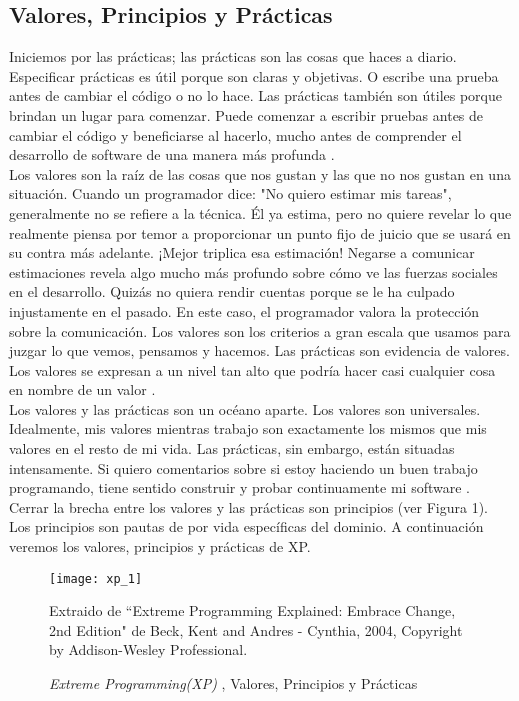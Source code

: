 \begin{spacing}{1.5}
	\subsection{Valores, Principios y Pr\'{a}cticas}
		Iniciemos por las pr\'{a}cticas; las prácticas son las cosas que haces a diario. Especificar prácticas es útil porque son claras y objetivas. O escribe una prueba antes de cambiar el código o no lo hace. Las prácticas también son útiles porque brindan un lugar para comenzar. Puede comenzar a escribir pruebas antes de cambiar el código y beneficiarse al hacerlo, mucho antes de comprender el desarrollo de software de una manera más profunda \cite{chap2_extreme_programming}.\\
		Los valores son la raíz de las cosas que nos gustan y las que no nos gustan en una situación. Cuando un programador dice: "No quiero estimar mis tareas", generalmente no se refiere a la técnica. Él ya estima, pero no quiere revelar lo que realmente piensa por temor a proporcionar un punto fijo de juicio que se usará en su contra más adelante. ¡Mejor triplica esa estimación! Negarse a comunicar estimaciones revela algo mucho más profundo sobre cómo ve las fuerzas sociales en el desarrollo. Quizás no quiera rendir cuentas porque se le ha culpado injustamente en el pasado. En este caso, el programador valora la protección sobre la comunicación. Los valores son los criterios a gran escala que usamos para juzgar lo que vemos, pensamos y hacemos. Las prácticas son evidencia de valores. Los valores se expresan a un nivel tan alto que podría hacer casi cualquier cosa en nombre de un valor \cite{chap2_extreme_programming}.\\
		Los valores y las prácticas son un océano aparte. Los valores son universales. Idealmente, mis valores mientras trabajo son exactamente los mismos que mis valores en el resto de mi vida. Las prácticas, sin embargo, están situadas intensamente. Si quiero comentarios sobre si estoy haciendo un buen trabajo programando, tiene sentido construir y probar continuamente mi software \cite{chap2_extreme_programming}.
		Cerrar la brecha entre los valores y las prácticas son principios (ver Figura 1). Los principios son pautas de por vida específicas del dominio. A continuaci\'{o}n veremos los valores, principios y prácticas de XP.
		\begin{figure}[H]
			\texttt{[image: xp\_1]}
			\caption {\centering \small{\textit{Extreme Programming(XP)} , Valores, Principios y Pr\'{a}cticas}} \label{figure:chaperII_2}
			\small {Extraido de ``Extreme Programming Explained: Embrace Change, 2nd Edition" de Beck, Kent and Andres - Cynthia, 2004, Copyright by Addison-Wesley Professional.}
		\end{figure}
		

\end{spacing}
